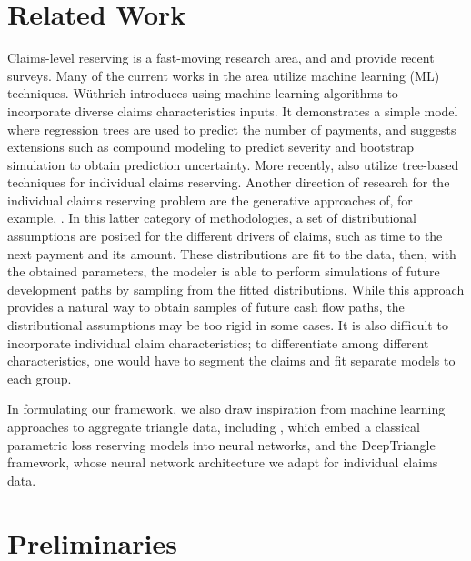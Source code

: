 \documentclass{article}
\begin{document}
\section{Related Work}

Claims-level reserving is a fast-moving research area, and 
\cite{boumezouedIndividualClaims2017} and \cite{taylorLossReserving2019} provide
recent surveys. Many of the current works in the area utilize machine learning 
(ML) techniques. Wüthrich \cite{wuthrichMachineLearning2018} introduces using machine 
learning algorithms to incorporate diverse claims characteristics inputs. It 
demonstrates a simple model where regression trees are used to predict the
number of payments, and suggests extensions such as compound modeling to predict
severity and bootstrap simulation to obtain prediction uncertainty. More 
recently,  \cite{duvalIndividualLoss2019, lopezTreeBasedAlgorithm2019, 
baudryMachineLearning} also utilize tree-based techniques for individual claims
reserving. Another direction of research for the individual claims reserving 
problem are the generative approaches of, for example, 
\cite{antonioMicrolevelStochastic2014, pigeonIndividualLoss2013, 
pigeonIndividualLoss2014}. In this latter category of methodologies, a set of
distributional assumptions are posited for the different drivers of claims, 
such as time to the next payment and its amount. These distributions are fit to
the data, then, with the obtained parameters, the modeler is able to perform 
simulations of future development paths by sampling from the fitted 
distributions. While this approach provides a natural way to obtain samples of
future cash flow paths, the distributional assumptions may be too rigid in some 
cases. It is also difficult to incorporate individual claim characteristics; to 
differentiate among different characteristics, one would have to segment the 
claims and fit separate models to each group.

In formulating our framework, we also draw inspiration from machine learning 
approaches to aggregate triangle data, including 
\cite{gabrielliNeuralNetwork2019a, gabrielliNeuralNetwork2019}, which embed a
classical parametric loss reserving models into neural networks, and the 
DeepTriangle \cite{kuo2019deeptriangle} framework, whose neural network 
architecture we adapt for individual claims data.

\section{Preliminaries}
\end{document}

